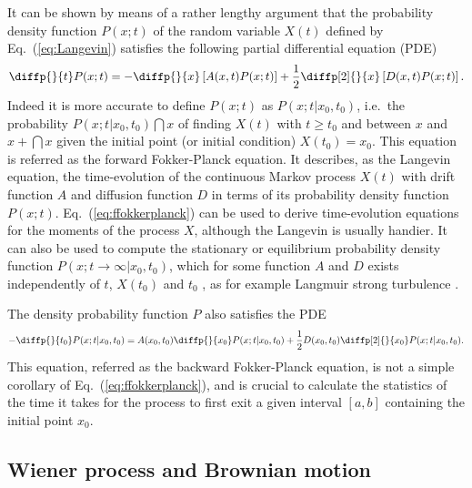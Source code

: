 \documentclass[10pt,a4paper]{article}
\newcommand{\eq}[1]{Eq.~(\ref{#1})}
\newcommand{\PDE}{\renewcommand{\PDE}{PDE\xspace}partial differential equation (PDE)\xspace}
\begin{document}
It can be shown by means of a rather lengthy argument that the probability
density function $P(x;t)$ of the random variable $X(t)$ defined by
\eq{eq:Langevin} satisfies the following \PDE \citep{gillespie:1996a}
\begin{align}
\diffp{}{t}P(x;t) = -\diffp{}{x}\left[A(x,t)P(x;t)\right]
+\frac{1}{2}\diffp[2]{}{x}\left[D(x,t)P(x;t)\right].
\label{eq:ffokkerplanck}
\end{align}
Indeed it is more accurate to define $P(x;t)$ as 
$P(x;t|x_0,t_0)$, i.e.\ the probability $P(x;t|x_0, t_0)\dint{x}$ of finding 
$X(t)$ with $t\geq t_0$ and between $x$ and $x{+}\dint{x}$ given the initial 
point (or initial condition) $X(t_0)=x_0$.
This equation is referred as the forward Fokker-Planck equation. It describes,
as the Langevin equation, the time-evolution of the continuous Markov process
$X(t)$ with drift function $A$ and diffusion function $D$ in terms of its
probability density function $P(x;t)$.
\eq{eq:ffokkerplanck} can be used to derive time-evolution equations for the
moments of the process $X$, although the Langevin is usually handier. 
It can also be used to compute the stationary or equilibrium probability
density function $P(x;t\rightarrow\infty|x_0, t_0)$, which for some
function $A$ and $D$ exists independently of $t$, $X(t_0)$ and $t_0$
\citep{gillespie:1996c}, as for example Langmuir strong turbulence \citep{?}.

The density probability function $P$ also satisfies the \PDE
\begin{align}
-\diffp{}{{t_0}}P(x;t|x_0, t_0) = A(x_0,t_0)\diffp{}{{x_0}}P(x;t|x_0, t_0)
+\frac{1}{2}D(x_0,t_0)\diffp[2]{}{{x_0}}P(x;t|x_0, t_0).
\label{eq:bfokkerplanck}
\end{align}
This equation, referred as the backward Fokker-Planck equation, is not a
simple corollary of \eq{eq:ffokkerplanck}, and is crucial to calculate the
statistics of the time it takes for the process to first exit a given
interval $[a,b]$ containing the initial point $x_0$.


\subsection{Wiener process and Brownian motion}
\end{document}
